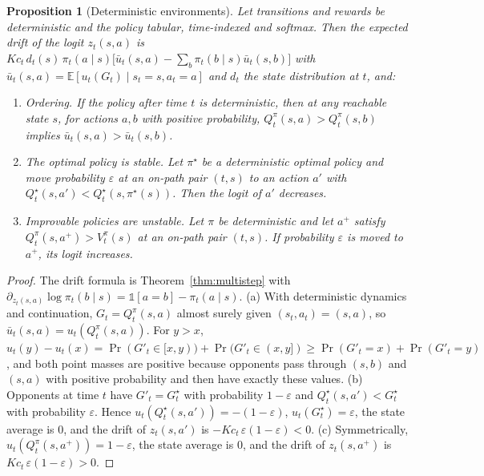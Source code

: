 \documentclass[11pt]{article}
\newtheorem{proposition}{Proposition}
\theoremstyle{remark}
\newcommand{\E}{\mathbb{E}}
\begin{document}
\begin{proposition}[Deterministic environments]
\label{prop:detmdp}
Let transitions and rewards be deterministic and the policy tabular, time-indexed and softmax. Then the expected drift of the logit $z_t(s,a)$ is $K c_t\,d_t(s)\,\pi_t(a\mid s)\big[\bar u_t(s,a)-\sum_b\pi_t(b\mid s)\bar u_t(s,b)\big]$ with $\bar u_t(s,a)=\E[u_t(G_t)\mid s_t=s,a_t=a]$ and $d_t$ the state distribution at $t$, and:
\begin{enumerate}
\item[(a)] \emph{Ordering.} If the policy after time $t$ is deterministic, then at any reachable state $s$, for actions $a,b$ with positive probability, $Q^\pi_t(s,a)>Q^\pi_t(s,b)$ implies $\bar u_t(s,a)>\bar u_t(s,b)$.
\item[(b)] \emph{The optimal policy is stable.} Let $\pi^\star$ be a deterministic optimal policy and move probability $\varepsilon$ at an on-path pair $(t,s)$ to an action $a'$ with $Q^\star_t(s,a')<Q^\star_t(s,\pi^\star(s))$. Then the logit of $a'$ decreases.
\item[(c)] \emph{Improvable policies are unstable.} Let $\pi$ be deterministic and let $a^+$ satisfy $Q^\pi_t(s,a^+)>V^\pi_t(s)$ at an on-path pair $(t,s)$. If probability $\varepsilon$ is moved to $a^+$, its logit increases.
\end{enumerate}
\end{proposition}
\begin{proof}
The drift formula is Theorem~\ref{thm:multistep} with $\partial_{z_t(s,a)}\log\pi_t(b\mid s)=\mathbb{1}[a=b]-\pi_t(a\mid s)$.
(a) With deterministic dynamics and continuation, $G_t=Q^\pi_t(s,a)$ almost surely given $(s_t,a_t)=(s,a)$, so $\bar u_t(s,a)=u_t(Q^\pi_t(s,a))$. For $y>x$, $u_t(y)-u_t(x)=\Pr(G'_t\in[x,y))+\Pr(G'_t\in(x,y])\ge\Pr(G'_t=x)+\Pr(G'_t=y)$, and both point masses are positive because opponents pass through $(s,b)$ and $(s,a)$ with positive probability and then have exactly these values.
(b) Opponents at time $t$ have $G'_t=G^\star_t$ with probability $1-\varepsilon$ and $Q^\star_t(s,a')<G^\star_t$ with probability $\varepsilon$. Hence $u_t(Q^\star_t(s,a'))=-(1-\varepsilon)$, $u_t(G^\star_t)=\varepsilon$, the state average is $0$, and the drift of $z_t(s,a')$ is $-K c_t\,\varepsilon(1-\varepsilon)<0$.
(c) Symmetrically, $u_t(Q^\pi_t(s,a^+))=1-\varepsilon$, the state average is $0$, and the drift of $z_t(s,a^+)$ is $K c_t\,\varepsilon(1-\varepsilon)>0$.
\end{proof}
\end{document}
